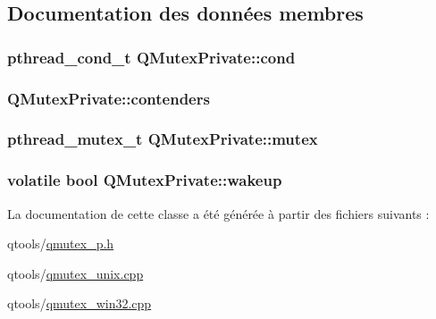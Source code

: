 \subsection{Documentation des données membres}
\hypertarget{class_q_mutex_private_a58da8d570849a70617e6f87d2945f639}{}
\subsubsection[{cond}]{\setlength{\rightskip}{0pt plus 5cm}pthread\+\_\+cond\+\_\+t Q\+Mutex\+Private\+::cond}\label{class_q_mutex_private_a58da8d570849a70617e6f87d2945f639}
\hypertarget{class_q_mutex_private_a4ac3e54a95eed7cc3b0f9a1bc80e34f1}{}
\subsubsection[{contenders}]{ Q\+Mutex\+Private\+::contenders}\label{class_q_mutex_private_a4ac3e54a95eed7cc3b0f9a1bc80e34f1}
\hypertarget{class_q_mutex_private_acd3490bc71fdb04de75a7055b1211def}{}
\subsubsection[{mutex}]{\setlength{\rightskip}{0pt plus 5cm}pthread\+\_\+mutex\+\_\+t Q\+Mutex\+Private\+::mutex}\label{class_q_mutex_private_acd3490bc71fdb04de75a7055b1211def}
\hypertarget{class_q_mutex_private_acae53ac5787f6fe69be1321d069f5f7d}{}
\subsubsection[{wakeup}]{\setlength{\rightskip}{0pt plus 5cm}volatile {\bf bool} Q\+Mutex\+Private\+::wakeup}\label{class_q_mutex_private_acae53ac5787f6fe69be1321d069f5f7d}


La documentation de cette classe a été générée à partir des fichiers suivants \+:\begin{DoxyCompactItemize}
\item 
qtools/\hyperlink{qmutex__p_8h}{qmutex\+\_\+p.\+h}\item 
qtools/\hyperlink{qmutex__unix_8cpp}{qmutex\+\_\+unix.\+cpp}\item 
qtools/\hyperlink{qmutex__win32_8cpp}{qmutex\+\_\+win32.\+cpp}\end{DoxyCompactItemize}
